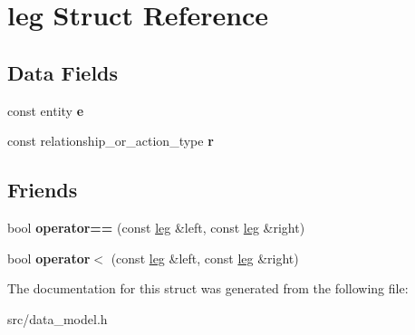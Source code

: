 \hypertarget{structleg}{}\section{leg Struct Reference}
\label{structleg}
\subsection*{Data Fields}
\begin{DoxyCompactItemize}
\item 
\mbox{\label{structleg_a25bc8afc8fdc636963b7cae1f5bbaa3b}} 
const entity {\bfseries e}
\item 
\mbox{\label{structleg_a8136189afab60f788096b94d01b91d1c}} 
const relationship\+\_\+or\+\_\+action\+\_\+type {\bfseries r}
\end{DoxyCompactItemize}
\subsection*{Friends}
\begin{DoxyCompactItemize}
\item 
\mbox{\label{structleg_a79d778afcc9e6d9a84a5e5621d9e7223}} 
bool {\bfseries operator==} (const \hyperlink{structleg}{leg} \&left, const \hyperlink{structleg}{leg} \&right)
\item 
\mbox{\label{structleg_a050cb42dbf3c9c1063f14234d5902bee}} 
bool {\bfseries operator$<$} (const \hyperlink{structleg}{leg} \&left, const \hyperlink{structleg}{leg} \&right)
\end{DoxyCompactItemize}


The documentation for this struct was generated from the following file\+:\begin{DoxyCompactItemize}
\item 
src/data\+\_\+model.\+h\end{DoxyCompactItemize}
